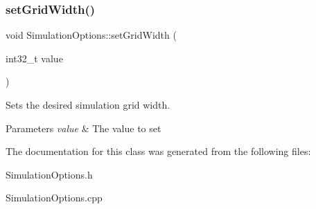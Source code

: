\subsubsection{\texorpdfstring{setGridWidth()}{setGridWidth()}}
{\footnotesize\ttfamily void Simulation\+Options\+::set\+Grid\+Width (\begin{DoxyParamCaption}\item[{int32\+\_\+t}]{value }\end{DoxyParamCaption})}



Sets the desired simulation grid width. 


\begin{DoxyParams}{Parameters}
{\em value} & The value to set\\
\hline
\end{DoxyParams}


The documentation for this class was generated from the following files\+:\begin{DoxyCompactItemize}
\item 
Simulation\+Options.\+h\item 
Simulation\+Options.\+cpp\end{DoxyCompactItemize}
